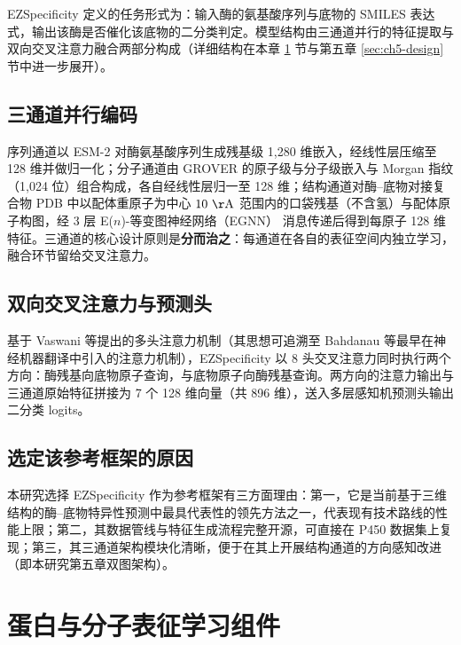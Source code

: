 EZSpecificity\cite{EZSpec2025} 定义的任务形式为：输入酶的氨基酸序列与底物的 SMILES 表达式，输出该酶是否催化该底物的二分类判定。模型结构由三通道并行的特征提取与双向交叉注意力融合两部分构成（详细结构在本章 \ref{sec:representation} 节与第五章 \ref{sec:ch5-design} 节中进一步展开）。

\subsection{三通道并行编码}
\label{subsec:ezspec-encoders}

序列通道以 ESM-2\cite{ESM2023} 对酶氨基酸序列生成残基级 1{,}280 维嵌入，经线性层压缩至 128 维并做归一化；分子通道由 GROVER\cite{GROVER2020} 的原子级与分子级嵌入与 Morgan 指纹\cite{ECFP2010}（1{,}024 位）组合构成，各自经线性层归一至 128 维；结构通道对酶--底物对接复合物 PDB 中以配体重原子为中心 $10~\mathrm{\AA}$ 范围内的口袋残基（不含氢）与配体原子构图，经 3 层 E($n$)-等变图神经网络（EGNN）\cite{EGNN2021} 消息传递后得到每原子 128 维特征。三通道的核心设计原则是\textbf{分而治之}：每通道在各自的表征空间内独立学习，融合环节留给交叉注意力。

\subsection{双向交叉注意力与预测头}
\label{subsec:ezspec-attention}

基于 Vaswani 等提出的多头注意力机制\cite{Transformer2017}（其思想可追溯至 Bahdanau 等最早在神经机器翻译中引入的注意力机制\cite{Bahdanau2015}），EZSpecificity 以 8 头交叉注意力同时执行两个方向：酶残基向底物原子查询，与底物原子向酶残基查询。两方向的注意力输出与三通道原始特征拼接为 7 个 128 维向量（共 896 维），送入多层感知机预测头输出二分类 logits。

\subsection{选定该参考框架的原因}
\label{subsec:ezspec-rationale}

本研究选择 EZSpecificity 作为参考框架有三方面理由：第一，它是当前基于三维结构的酶--底物特异性预测中最具代表性的领先方法之一，代表现有技术路线的性能上限；第二，其数据管线与特征生成流程完整开源，可直接在 P450 数据集上复现；第三，其三通道架构模块化清晰，便于在其上开展结构通道的方向感知改进（即本研究第五章双图架构）。

\section{蛋白与分子表征学习组件}
\label{sec:representation}

